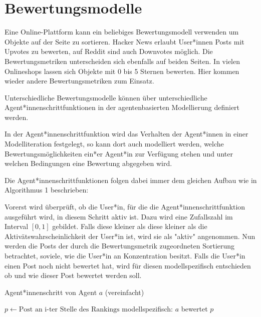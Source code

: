 \section{Bewertungsmodelle}

Eine Online-Plattform kann ein beliebiges Bewertungsmodell verwenden um Objekte auf der Seite zu sortieren. Hacker News erlaubt User*innen Posts mit Upvotes zu bewerten, auf Reddit sind auch Downvotes möglich. Die Bewertungsmetriken unterscheiden sich ebenfalls auf beiden Seiten. In vielen Onlineshops lassen sich Objekte mit 0 bis 5 Sternen bewerten. Hier kommen wieder andere Bewertungsmetriken zum Einsatz.

Unterschiedliche Bewertungsmodelle können über unterschiedliche Agent*innenschrittfunktionen in der agentenbasierten Modellierung definiert werden. 

In der Agent*innenschrittfunktion wird das Verhalten der Agent*innen in einer Modelliteration festgelegt, so kann dort auch modelliert werden, welche Bewertungsmöglichkeiten ein*er Agent*in zur Verfügung stehen und unter welchen Bedingungen eine Bewertung abgegeben wird.

Die Agent*innenschrittfunktionen folgen dabei immer dem gleichen Aufbau wie in Algorithmus 1 beschrieben:

Vorerst wird überprüft, ob die User*in, für die die Agent*innenschrittfunktion ausgeführt wird, in diesem Schritt aktiv ist. Dazu wird eine Zufallszahl im Interval $[0,1]$ gebildet. Falls diese kleiner als diese kleiner als die Aktivätswahrscheinlichkeit der User*in ist, wird sie als "aktiv" angenommen. Nun werden die Posts der durch die Bewertungsmetrik zugeordneten Sortierung betrachtet, soviele, wie die User*in an Konzentration besitzt. Falls die User*in einen Post noch nicht bewertet hat, wird für diesen modellspezifisch entschieden ob und wie dieser Post bewertet werden soll.

\begin{algorithm}
	\label{aschritt}
	\caption{Agent*innenschritt von Agent $a$ (vereinfacht)}
	\begin{algorithmic}
				\State $p\gets \text{Post an i-ter Stelle des Rankings} $
				\State modellspezifisch: $a$ bewertet $p$
				\EndIf
			\EndFor
		\EndIf
	\end{algorithmic}
\end{algorithm}

